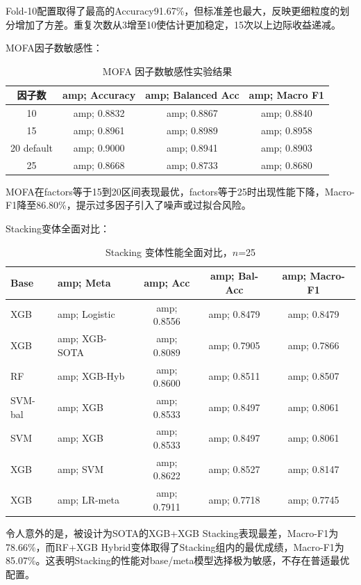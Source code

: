 Fold-10配置取得了最高的Accuracy91.67\%，但标准差也最大，反映更细粒度的划分增加了方差。重复次数从3增至10使估计更加稳定，15次以上边际收益递减。

MOFA因子数敏感性：

\begin{table}[H]
\centering
\caption{MOFA 因子数敏感性实验结果}
\label{tab:mofa-sensitivity}
\begin{tabular}{cccc}
\toprule
因子数 &amp; Accuracy &amp; Balanced Acc &amp; Macro F1 \\
\midrule
10 &amp; 0.8832 &amp; 0.8867 &amp; 0.8840 \\
15 &amp; 0.8961 &amp; 0.8989 &amp; 0.8958 \\
20 default &amp; 0.9000 &amp; 0.8941 &amp; 0.8903 \\
25 &amp; 0.8668 &amp; 0.8733 &amp; 0.8680 \\
\bottomrule
\end{tabular}
\end{table}

MOFA在factors等于15到20区间表现最优，factors等于25时出现性能下降，Macro-F1降至86.80\%，提示过多因子引入了噪声或过拟合风险。

Stacking变体全面对比：

\begin{table}[H]
\centering
\small
\caption{Stacking 变体性能全面对比，$n$=25}
\label{tab:stacking-all}
\begin{tabular}{llccc}
\toprule
Base &amp; Meta &amp; Acc &amp; Bal-Acc &amp; Macro-F1 \\
\midrule
XGB &amp; Logistic &amp; 0.8556 &amp; 0.8479 &amp; 0.8479 \\
XGB &amp; XGB-SOTA &amp; 0.8089 &amp; 0.7905 &amp; 0.7866 \\
RF &amp; XGB-Hyb &amp; 0.8600 &amp; 0.8511 &amp; 0.8507 \\
SVM-bal &amp; XGB &amp; 0.8533 &amp; 0.8497 &amp; 0.8061 \\
SVM &amp; XGB &amp; 0.8533 &amp; 0.8497 &amp; 0.8061 \\
XGB &amp; SVM &amp; 0.8622 &amp; 0.8527 &amp; 0.8147 \\
XGB &amp; LR-meta &amp; 0.7911 &amp; 0.7718 &amp; 0.7745 \\
\bottomrule
\end{tabular}
\end{table}

令人意外的是，被设计为SOTA的XGB+XGB Stacking表现最差，Macro-F1为78.66\%，而RF+XGB Hybrid变体取得了Stacking组内的最优成绩，Macro-F1为85.07\%。这表明Stacking的性能对base/meta模型选择极为敏感，不存在普适最优配置。

